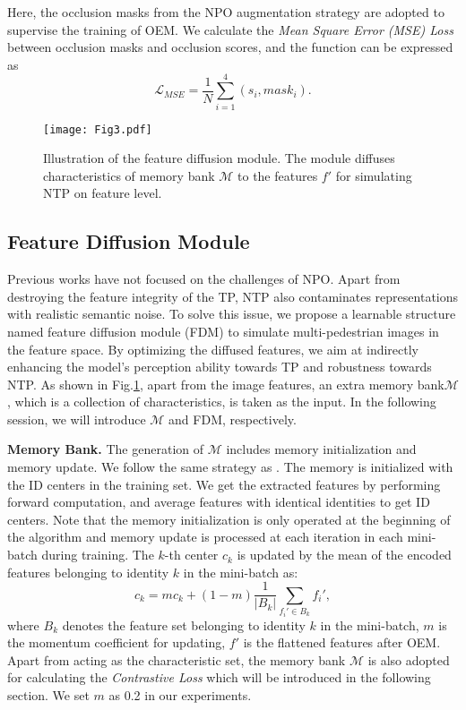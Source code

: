 \documentclass[10pt,twocolumn,letterpaper]{article}
\begin{document}
Here, the occlusion masks from the NPO augmentation strategy are adopted to supervise the training of OEM. We calculate the \emph{Mean Square Error (MSE) Loss} between occlusion masks and occlusion scores, and the function can be expressed as
\begin{equation}
    \mathcal{L}_{MSE}=\frac{1}{N}\sum_{i=1}^{4}(s_i, mask_i).
\end{equation}


\begin{figure}[t]
  \centering
   \texttt{[image: Fig3.pdf]}
   \caption{Illustration of the feature diffusion module. The module diffuses characteristics of memory bank $\mathcal{M}$ to the features $f'$ for simulating NTP on feature level. 
   }
   \label{Fig3}
\end{figure}



\subsection{Feature Diffusion Module}
Previous works have not focused on the challenges of NPO. Apart from destroying the feature integrity of the TP, NTP also contaminates representations with realistic semantic noise. To solve this issue, we propose a learnable structure named feature diffusion module (FDM) to simulate multi-pedestrian images in the feature space. By optimizing the diffused features, we aim at indirectly enhancing the model's perception ability towards TP and robustness towards NTP. As shown in Fig.\ref{Fig3}, apart from the image features, an extra memory bank$\mathcal{M}$, which is a collection of characteristics, is taken as the input. In the following session, we will introduce $\mathcal{M}$ and FDM, respectively. 

\textbf{Memory Bank.}
The generation of $\mathcal{M}$ includes memory initialization and memory update. We follow the same strategy as \cite{ge2020self}. The memory is initialized with the ID centers in the training set. We get the extracted features by performing forward computation, and average features with identical identities to get ID centers. 
Note that the memory initialization is only operated at the beginning of the algorithm and memory update is processed at each iteration in each mini-batch during training. The $k$-th center $c_k$ is updated by the mean of the encoded features belonging to identity $k$ in the mini-batch as:
\begin{equation}
    c_k = m c_k + (1 - m) \frac{1}{|B_k|}\sum_{f_i' \in B_k}f_i',
\end{equation}
where $B_k$ denotes the feature set belonging to identity $k$ in the mini-batch, $m$ is the momentum coefficient for updating, $f'$ is the flattened features after OEM. Apart from acting as the characteristic set, the memory bank $\mathcal{M}$ is also adopted for calculating the \emph{Contrastive Loss} which will be introduced in the following section. 
We set $m$ as 0.2 in our experiments. 
\end{document}

